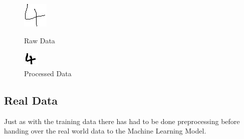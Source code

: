\documentclass[@CLASSOPTIONS@]{tumarticle}
\begin{document}
\begin{figure}[!htb]
   \begin{minipage}{0.24\textwidth}
     \centering
     \includegraphics[width=.7\linewidth]{figures/4_clean}
     \caption{Raw Data}\label{Fig:Data1}
   \end{minipage}\hfill
   \begin{minipage}{0.24\textwidth}
     \centering
     \includegraphics[width=.7\linewidth]{figures/4_sampled}
     \caption{Processed Data}\label{Fig:Data2}
   \end{minipage}
\end{figure}

\subsection{Real Data}
\label{realdata}
Just as with the training data there has had to be done preprocessing before handing
over the real world data to the Machine Learning Model.
\end{document}
